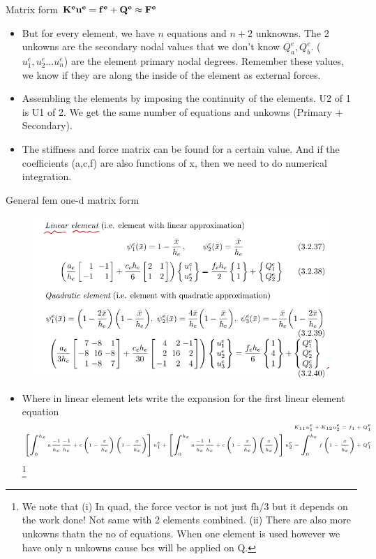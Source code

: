 	\begin{frame}
		\begin{block}{Matrix form}
			\centering
			$\mathbf{K^eu^e = f^e + Q^e \approx F^e}$
		\end{block}
		\begin{itemize}
			\item But for every element, we have $n$ equations and $n+2$ unknowns. The 2 unkowns are the secondary nodal values that we don't know $Q_a^e, Q_b^e$. ($u_1^e,u_2^e...u_n^e$) are the element primary nodal degrees. Remember these values, we know if they are along the inside of the element as external forces. 
			\item Assembling the elements by imposing the continuity of the elements. U2 of 1 is U1 of 2. We get the same number of equations and unkowns (Primary + Secondary). 
			\item The stiffness and force matrix can be found for a certain value. And if the coefficients (a,c,f) are also functions of x, then we need to do numerical integration. 
		\end{itemize}
	\end{frame}


	\begin{frame}{General fem one-d matrix form}
		\begin{figure}
			\centering
			\includegraphics[width=0.7\linewidth]{Figure/fig5} 
		\end{figure}
	
	     \begin{itemize}
	     	\item Where in linear element lets write the expansion for the first linear element equation
	     	\begin{equation}
	     	\tiny
	     	\begin{aligned}
	     		    K_{11}u_1^e + K_{12}u_2^e = {f_1} + Q_1^e \\ 
	     		    \left[\int_{0}^{h_e} a\frac{-1}{h_e}\frac{-1}{h_e} + c\left(1-\frac{x}{h_e} \right)\left(1-\frac{x}{h_e} \right) \right] u_1^e 
	     		    + \left[\int_{0}^{h_e} a\frac{-1}{h_e}\frac{1}{h_e} + c\left(1 -\frac{x}{h_e} \right)\left(\frac{x}{h_e} \right) \right] u_2^e  =  \int_{0}^{h_e} f\left(1-\frac{x}{h_e} \right) + Q_1^e 
	     	\end{aligned}
	     	\end{equation}
	     	\footnote{ We note that (i) In quad, the force vector is not just fh/3 but it depends on the work done! Not same with 2 elements combined. (ii) There are also more unkowns thatn the no of equations. When one element is used however we have only n unkowns cause bcs will be applied on Q.}  
	     \end{itemize}
	\end{frame}


